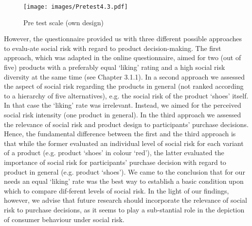 \begin{figure}[H]
		\texttt{[image: images/Pretest4.3.pdf]}
		\caption{Pre test scale (own design)}\label{fig:pretest_scale}
\end{figure}
However, the questionnaire provided us with three different possible approaches to evalu-ate social risk with regard to product decision-making. The first approach, which was adapted in the online questionnaire, aimed for two (out of five) products with a preferably equal ‘liking’ rating and a high social risk diversity at the same time (see Chapter 3.1.1). In a second approach we assessed the aspect of social risk regarding the products in general (not ranked according to a hierarchy of five alternatives), e.g. the social risk of the product ‘shoes’ itself. In that case the ‘liking’ rate was irrelevant. Instead, we aimed for the perceived social risk intensity (one product in general). In the third approach we assessed the relevance of social risk and product design to participants’ purchase decisions. Hence, the fundamental difference between the first and the third approach is that while the former evaluated an individual level of social risk for each variant of a product (e.g. product ‘shoes’ in colour ‘red’), the latter evaluated the importance of social risk for participants’ purchase decision with regard to product in general (e.g. product ‘shoes’). We came to the conclusion that for our needs an equal ‘liking’ rate was the best way to establish a basic condition upon which to compare dif-ferent levels of social risk. In the light of our findings, however, we advise that future research should incorporate the relevance of social risk to purchase decisions, as it seems to play a sub-stantial role in the depiction of consumer behaviour under social risk.\par
